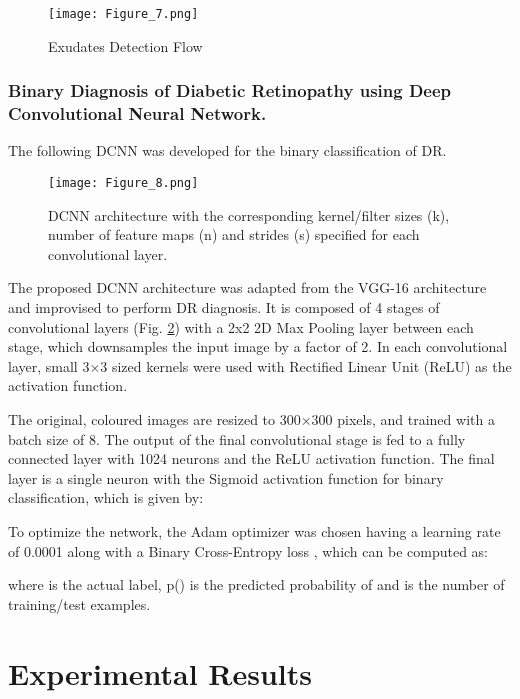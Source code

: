 \documentclass{svproc}
\begin{document}
\vspace{-4mm}
\begin{figure}
    \centering
    \texttt{[image: Figure\_7.png]}
    \caption{Exudates Detection Flow}
    \label{fig: fig7}
\end{figure}


\subsubsection{Binary Diagnosis of Diabetic Retinopathy using Deep Convolutional Neural Network.}


The following DCNN was developed for the binary classification of DR.

\begin{figure}
    \centering
    \texttt{[image: Figure\_8.png]}
    \caption{DCNN architecture with the corresponding kernel/filter sizes (k), number of feature maps (n) and strides (s) specified for each convolutional layer.}
    \label{fig: fig8}
\end{figure}

The proposed DCNN architecture was adapted from the VGG-16 \cite{vgg} architecture and improvised to perform DR diagnosis. It is composed of 4 stages of convolutional layers (Fig. \ref{fig: fig8}) with a 2x2 2D Max Pooling layer between each stage, which downsamples the input image by a factor of 2. In each convolutional layer, small 3×3 sized kernels were used with Rectified Linear Unit (ReLU) as the activation function.



The original, coloured images are resized to 300×300 pixels, and trained with a batch size of 8. The output of the final convolutional stage is fed to a fully connected layer with 1024 neurons and the ReLU activation function. The final layer is a single neuron with the Sigmoid activation function for binary classification, which is given by:



To optimize the network, the Adam \cite{adam} optimizer was chosen having a learning rate of 0.0001 along with a Binary Cross-Entropy loss , which can be computed as:



where  is the actual label, p() is the predicted probability of  and  is the number of training/test examples.

\section{Experimental Results}
\end{document}
